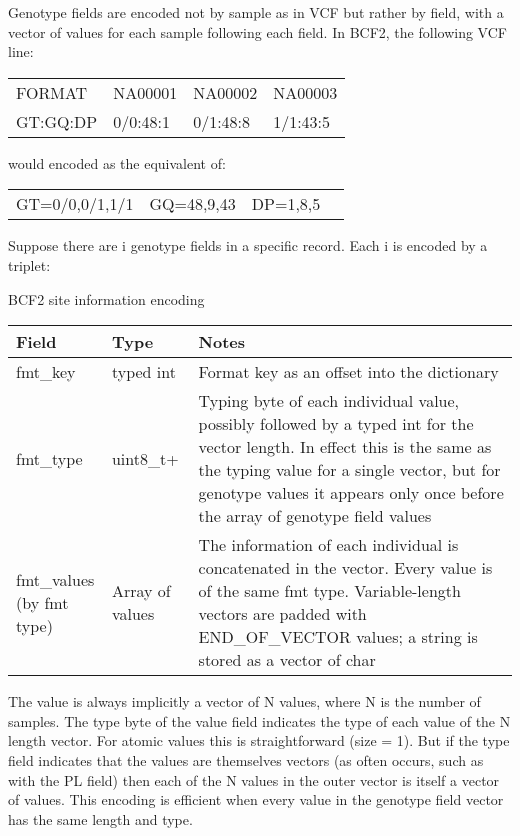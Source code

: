 \documentclass[8pt]{article}
\begin{document}
Genotype fields are encoded not by sample as in VCF but rather by field, with a vector of values for each sample following each field.
In BCF2, the following VCF line:

\vspace{0.3cm}
\begin{tabular}{l l l l}
FORMAT & NA00001 & NA00002 & NA00003 \\
GT:GQ:DP & 0/0:48:1 & 0/1:48:8 & 1/1:43:5 \\
\end{tabular}
\vspace{0.3cm}

would encoded as the equivalent of:

\vspace{0.3cm}
\begin{tabular}{l l l l}
GT=0/0,0/1,1/1 & GQ=48,9,43 & DP=1,8,5
\end{tabular}
\vspace{0.3cm}

Suppose there are i genotype fields in a specific record.
Each i is encoded by a triplet:

BCF2 site information encoding

\vspace{0.3cm}
\small
\begin{tabular}{ | p{2cm} | p{2.5cm} | p{9.5cm} | } \hline
Field & Type & Notes \\ \hline
fmt\_key & typed int & Format key as an offset into the dictionary \\ \hline
fmt\_type & uint8\_t+ & Typing byte of each individual value, possibly followed by a typed int for the vector length.  
In effect this is the same as the typing value for a single vector, but for genotype values it appears only once before the array of genotype field values \\ \hline
\makecell[tl]{fmt\_values \\ (by fmt type)} & Array of values & The information of each individual is concatenated in the vector.  Every value is of the same fmt type.
Variable-length vectors are padded with END\_OF\_VECTOR values; a string is stored as a vector of char \\  \hline
\end{tabular}
\normalsize
\vspace{0.3cm}

The value is always implicitly a vector of N values, where N is the number of samples.
The type byte of the value field indicates the type of each value of the N length vector.
For atomic values this is straightforward (size = 1).
But if the type field indicates that the values are themselves vectors (as often occurs, such as with the PL field) then each of the N values in the outer vector is itself a vector of values.
This encoding is efficient when every value in the genotype field vector has the same length and type.
\end{document}
